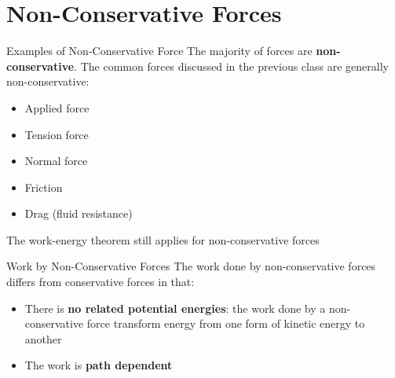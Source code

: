 \documentclass[12pt,compress,aspectratio=169]{beamer}
\begin{document}
%
%


\section{Non-Conservative Forces}

\begin{frame}{Examples of Non-Conservative Force}
  The majority of forces are \textbf{non-conservative}. The common forces
  discussed in the previous class are generally non-conservative:
  \begin{itemize}
  \item Applied force
  \item Tension force
  \item Normal force
  \item Friction%
  \item Drag (fluid resistance)
  \end{itemize}
  The work-energy theorem still applies for non-conservative forces
\end{frame}



\begin{frame}{Work by Non-Conservative Forces}
  The work done by non-conservative forces differs from conservative forces in
  that:
  \begin{itemize}
  \item There is \textbf{no related potential energies}: the work done by a
    non-conservative force transform energy from one form of kinetic energy to
    another
  \item The work is \textbf{path dependent}
  \end{itemize}
\end{frame}
\end{document}
